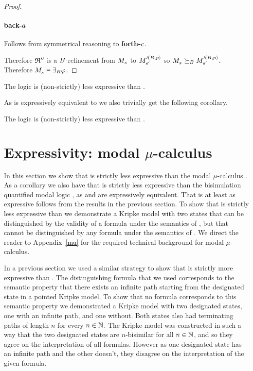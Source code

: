 \begin{proof}
\paragraph{back-$\agentA$}
Follows from symmetrical reasoning to {\bf forth-$\agentC$}.

Therefore $\refinement''$ is a $\agentsB$-refinement from $\kPModel{\kStateS}$ to $\kPModel[\prime(\agentsB, \atomP)]{\kStateSP}$ so $\kPModel{\kStateS} \simulatesBs \kPModel[\prime(\agentsB, \atomP)]{\kStateSP}$.
Therefore $\kPModel{\kStateS} \entails \somerefsBs \phi$.
\end{proof}

\begin{corollary}
The logic \logicRmlKF{} is (non-strictly) less expressive than \logicBqmlKF{}.
\end{corollary}

As \logicBqmlKF{} is expressively equivalent to \logicMuKF{} we also trivially get the following corollary. 

\begin{corollary}
The logic \logicRmlKF{} is (non-strictly) less expressive than \logicMuKF{}.
\end{corollary}

\section{Expressivity: modal $\mu$-calculus}\label{rml-k4-mu}

In this section we show that \logicRmlKF{} is strictly less expressive than the modal $\mu$-calculus \logicMuKF{}.
As a corollary we also have that \logicRmlKF{} is strictly less expressive than the bisimulation quantified modal logic \logicBqmlKF{}, as \logicMuKF{} and \logicBqmlKF{} are expressively equivalent.
That \logicMuKF{} is at least as expressive follows from the results in the previous section.
To show that \logicRmlKF{} is strictly less expressive than \logicMuKF{} we demonstrate a \classKF{} Kripke model with two states that can be distinguished by the validity of a \langMu{} formula under the semantics of \logicMuKF{}, but that cannot be distinguished by any \langRml{} formula under the semantics of \logicRmlKF{}. 
We direct the reader to Appendix~\ref{mu} for the required technical background for modal $\mu$-calculus.

In a previous section we used a similar strategy to show that \logicRmlKF{} is strictly more expressive than \logicKF{}.
The distinguishing \langRml{} formula that we used corresponds to the semantic property that there exists an infinite path starting from the designated state in a pointed Kripke model.
To show that no \langMl{} formula corresponds to this semantic property we demonstrated a \classKF{} Kripke model with two designated states, one with an infinite path, and one without.
Both states also had terminating paths of length $n$ for every $n \in \naturals$.
The Kripke model was constructed in such a way that the two designated states are $n$-bisimilar for all $n \in \naturals$, and so they agree on the interpretation of all \langMl{} formulas.
However as one designated state has an infinite path and the other doesn't, they disagree on the interpretation of the given \langRml{} formula.

